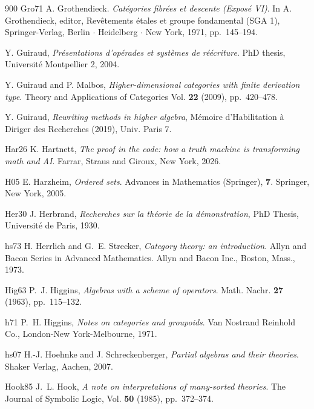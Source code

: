 \begin{thebibliography}{900}
\bibitem%
{Gro71} A. Grothendieck. \emph{Cat\'{e}gories fibr\'{e}es et
descente (Expos\'{e} VI)}.  In A. Grothendieck, editor,
Rev\^{e}tements \'{e}tales et groupe fondamental (SGA 1),
Springer-Verlag, Berlin $\cdot$ Heidelberg $\cdot$ New York, 1971, pp.~145--194.

Y. Guiraud, \emph{Pr\'esentations d'op\'erades et syst\`emes de r\'e\'ecriture}. PhD thesis, Universit\'e Montpellier 2, 2004.

Y. Guiraud and P. Malbos, \emph{Higher-dimensional categories with finite derivation type}. Theory and Applications of Categories Vol. \textbf{22} (2009), pp.~420--478.

Y. Guiraud, \emph{Rewriting methods in higher algebra}, Mémoire d'Habilitation à Diriger des Recherches (2019), Univ. Paris 7.

\bibitem%
{Har26} K. Hartnett, \emph{The proof in the code: how a truth machine is transforming math and AI}. Farrar, Straus and Giroux, New York, 2026.

\bibitem%
{H05} E. Harzheim, \emph{Ordered sets}. Advances in Mathematics (Springer), \textbf{7}. Springer, New York, 2005. 

\bibitem%
{Her30} J. Herbrand, \emph{Recherches sur la th\'{e}orie de la d\'{e}monstration}, PhD Thesis, Universit\'{e} de Paris, 1930.

\bibitem%
{hs73} H. Herrlich and G.~E. Strecker, \emph{Category theory: an introduction}. Allyn and Bacon Series in Advanced Mathematics. Allyn and Bacon Inc., Boston, Mass., 1973.


\bibitem%
{Hig63} P.~J. Higgins, \emph{Algebras with a scheme of operators}. Math. Nachr. \textbf{27} (1963), pp.~115--132. 

\bibitem%
{h71} P.~H. Higgins, \emph{Notes on categories and groupoids}. Van Nostrand Reinhold Co., London-New York-Melbourne, 1971.

\bibitem%
{hs07} H.-J. Hoehnke and J. Schreckenberger, \emph{Partial algebras and their theories}. Shaker Verlag, Aachen, 2007. 


\bibitem%
{Hook85} J.~L. Hook, \emph{A note on interpretations of many-sorted theories}. The Journal of Symbolic Logic, Vol. \textbf{50} (1985), pp.~372--374.


\end{thebibliography}
